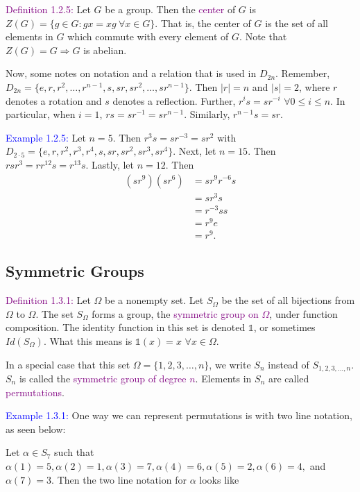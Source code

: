 \documentclass{article}
\begin{document}
\textcolor{purple}{Definition 1.2.5:} Let $G$ be a group. Then the \textcolor{purple}{center} of $G$ is $Z(G) = \{g \in G: gx = xg \ \forall x \in G\}$. 
That is, the center of $G$ is the set of all elements in $G$ which commute with every element of $G$. Note that $Z(G) = G \Longrightarrow G$ 
is abelian.

Now, some notes on notation and a relation that is used in $D_{2n}$. Remember, $D_{2n} = \{e,r,r^2, \dots, r^{n-1}, s, sr, sr^2, \dots, sr^{n-1}\}$. 
Then $|r| = n$ and $|s|=2$, where $r$ denotes a rotation and $s$ denotes a reflection. Further, $r^is = sr^{-i}$ $\forall 0 \leq i \leq n$. 
In particular, when $i=1$, $rs = sr^{-1} = sr^{n-1}$. Similarly, $r^{n-1}s = sr$.

\textcolor{blue}{Example 1.2.5:} Let $n=5$. Then $r^3s = sr^{-3} = sr^2$ with $D_{2 \cdot 5} = \{e,r,r^2,r^3,r^4,s,sr,sr^2,sr^3,sr^4\}$. 
Next, let $n=15$. Then $rsr^3 = rr^{12}s = r^{13}s$. Lastly, let $n = 12$. Then 
\begin{align*}
    (sr^9)(sr^6) &= sr^9r^{-6}s \\
    &= sr^3s \\
    &= r^{-3}ss \\
    &= r^9e \\
    &= r^9.
\end{align*}

\subsection{Symmetric Groups}
\textcolor{purple}{Definition 1.3.1:} Let $\Omega$ be a nonempty set. Let $S_{\Omega}$ be the set of all bijections from $\Omega$ to 
$\Omega$. The set $S_{\Omega}$ forms a group, the \textcolor{purple}{symmetric group on $\Omega$}, under function composition. The 
identity function in this set is denoted $\mathbb{1}$, or sometimes $Id(S_{\Omega})$. What this means is $\mathbb{1}(x)=x$ $\forall x \in \Omega$.

In a special case that this set $\Omega = \{1,2,3, \dots, n\}$, we write $S_n$ instead of $S_{1,2,3,\dots,n}$. $S_n$ is called the 
\textcolor{purple}{symmetric group of degree $n$}. Elements in $S_n$ are called \textcolor{purple}{permutations}.

\textcolor{blue}{Example 1.3.1:} One way we can represent permutations is with two line notation, as seen below:

Let $\alpha \in S_7$ such that $\alpha(1)=5, \alpha(2) = 1, \alpha(3)=7, \alpha(4)=6, \alpha(5)=2, \alpha(6)=4,$ and $\alpha(7)=3$. Then 
the two line notation for $\alpha$ looks like 
\end{document}
